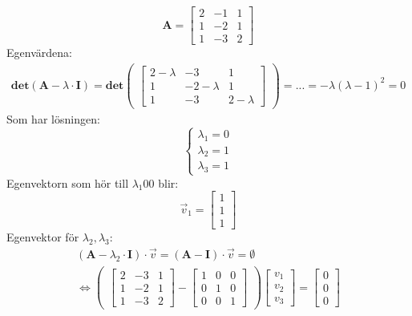 \begin{Ex}
	\[
	\mathbf{A} = \begin{bmatrix} 2&-1&1\\1&-2&1\\1&-3&2 \end{bmatrix}
	\]
	Egenvärdena:
	\begin{gather*}
		\mathbf{det}(\mathbf{A} - \lambda \cdot \mathbf{I}) = \mathbf{det}
		\begin{pmatrix}
			\begin{bmatrix}
				2 - \lambda& - 3 & 1\\
				1 & -2 -\lambda & 1\\
				1 & -3 & 2 - \lambda
			\end{bmatrix}
		\end{pmatrix} = ... = - \lambda(\lambda - 1)^2 = 0
	\end{gather*}
	Som har lösningen:
	\[
	\begin{cases}
		\lambda_1 = 0\\
		\lambda_2 = 1\\
		\lambda_3 = 1
	\end{cases}
	\]
	Egenvektorn som hör till $\lambda_1 0 0$ blir:
	\[
	\vec{v}_1 = \begin{bmatrix} 1\\1\\1 \end{bmatrix}
	\]
	Egenvektor för $\lambda_2, \lambda_3$:
	\begin{gather*}
		(\mathbf{A} - \lambda_2 \cdot \mathbf{I}) \cdot \vec{v} = 
		(\mathbf{A} - \mathbf{I}) \cdot \vec{v} = \emptyset\\
		\Leftrightarrow
		\begin{pmatrix}
			\begin{bmatrix}
				2 & -3 & 1\\
				1 & -2 & 1\\
				1 & -3 & 2	
			\end{bmatrix} - 
			\begin{bmatrix}
				1 & 0 & 0\\
				0 & 1 & 0\\
				0 & 0 & 1
			\end{bmatrix}
		\end{pmatrix}
		\begin{bmatrix} v_1\\v_2\\v_3 \end{bmatrix} = 
		\begin{bmatrix} 0\\0\\0 \end{bmatrix}\\

\end{gather*}
\end{Ex}
